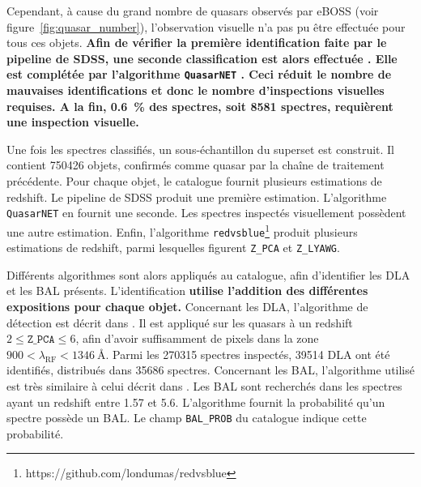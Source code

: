 \documentclass[11pt, twoside, a4paper, openright]{report}
\begin{document}
Cependant, à cause du grand nombre de quasars observés par eBOSS (voir figure~\ref{fig:quasar_number}), l'observation visuelle n'a pas pu être effectuée pour tous ces objets.
\textbf{Afin de vérifier la première identification faite par le pipeline de SDSS, une seconde classification est alors effectuée \citep{CITE:Lyke in prep}. Elle est complétée par l'algorithme \texttt{QuasarNET} \citep{Busca2018}. Ceci réduit le nombre de mauvaises identifications et donc le nombre d'inspections visuelles requises. A la fin, \SI{0.6}{\percent} des spectres, soit \num{8581} spectres, requièrent une inspection visuelle.
}

Une fois les spectres classifiés, un sous-échantillon du superset est construit. Il contient \num{750426} objets, confirmés comme quasar par la chaîne de traitement précédente.
Pour chaque objet, le catalogue fournit plusieurs estimations de redshift. Le pipeline de SDSS produit une première estimation. L'algorithme \texttt{QuasarNET} en fournit une seconde. Les spectres inspectés visuellement possèdent une autre estimation. Enfin, l'algorithme \texttt{redvsblue}\footnote{https://github.com/londumas/redvsblue} produit plusieurs estimations de redshift, parmi lesquelles figurent \texttt{Z\_PCA} et \texttt{Z\_LYAWG}.

Différents algorithmes sont alors appliqués au catalogue, afin d'identifier les DLA et les BAL présents. L'identification \textbf{utilise l'addition des différentes expositions pour chaque objet.}
Concernant les DLA, l'algorithme de détection est décrit dans \citet{Parks2017}. Il est appliqué sur les quasars à un redshift $2 \leq \texttt{Z\_PCA} \leq 6$, afin d'avoir suffisamment de pixels dans la zone $900 < \lambda_{\mathrm{RF}} < \SI{1346}{\angstrom}$. Parmi les \num{270315} spectres inspectés, \num{39514} DLA ont été identifiés, distribués dans \num{35686} spectres.
Concernant les BAL, l'algorithme utilisé est très similaire à celui décrit dans \citet{Guo2019}. Les BAL sont recherchés dans les spectres ayant un redshift entre \num{1.57} et \num{5.6}. L'algorithme fournit la probabilité qu'un spectre possède un BAL. Le champ \texttt{BAL\_PROB} du catalogue indique cette probabilité.
\end{document}
